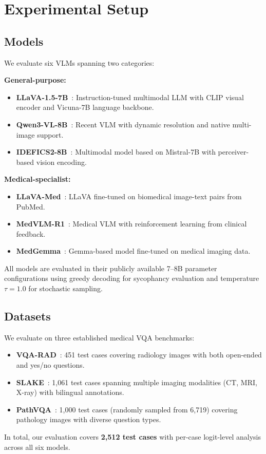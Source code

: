 \section{Experimental Setup}
\label{sec:experiments}

\subsection{Models}
We evaluate six VLMs spanning two categories:

\noindent\textbf{General-purpose:}
\begin{itemize}[leftmargin=*,itemsep=1pt,topsep=2pt]
    \item \textbf{LLaVA-1.5-7B}~\cite{liu2024llava}: Instruction-tuned multimodal LLM with CLIP visual encoder and Vicuna-7B language backbone.
    \item \textbf{Qwen3-VL-8B}~\cite{bai2025qwen3vl}: Recent VLM with dynamic resolution and native multi-image support.
    \item \textbf{IDEFICS2-8B}~\cite{laurencon2024idefics2}: Multimodal model based on Mistral-7B with perceiver-based vision encoding.
\end{itemize}

\noindent\textbf{Medical-specialist:}
\begin{itemize}[leftmargin=*,itemsep=1pt,topsep=2pt]
    \item \textbf{LLaVA-Med}~\cite{li2024llava-med}: LLaVA fine-tuned on biomedical image-text pairs from PubMed.
    \item \textbf{MedVLM-R1}~\cite{pan2025medvlm}: Medical VLM with reinforcement learning from clinical feedback.
    \item \textbf{MedGemma}~\cite{yang2024medgemma}: Gemma-based model fine-tuned on medical imaging data.
\end{itemize}

All models are evaluated in their publicly available 7--8B parameter configurations using greedy decoding for sycophancy evaluation and temperature $\tau{=}1.0$ for \lvase{} stochastic sampling.

\subsection{Datasets}
We evaluate on three established medical VQA benchmarks:
\begin{itemize}[leftmargin=*,itemsep=1pt,topsep=2pt]
    \item \textbf{VQA-RAD}~\cite{lau2018vqarad}: 451 test cases covering radiology images with both open-ended and yes/no questions.
    \item \textbf{SLAKE}~\cite{liu2021slake}: 1,061 test cases spanning multiple imaging modalities (CT, MRI, X-ray) with bilingual annotations.
    \item \textbf{PathVQA}~\cite{he2020pathvqa}: 1,000 test cases (randomly sampled from 6,719) covering pathology images with diverse question types.
\end{itemize}
In total, our evaluation covers \textbf{2,512 test cases} with per-case logit-level analysis across all six models.


